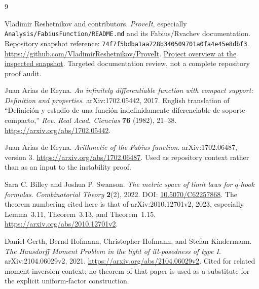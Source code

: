 \documentclass[11pt,a4paper]{article}
\theoremstyle{definition}
\theoremstyle{remark}
\newcommand{\repoSHA}{74f7f5bdba1aa728b340509701a0fa4e45e8dbf3}
\begin{document}
\begin{thebibliography}{9}
\small\raggedright

Vladimir Reshetnikov and contributors.
\emph{ProveIt}, especially \texttt{Analysis/FabiusFunction/README.md}
and its Fabius/Rvachev documentation.
Repository snapshot reference:
\texttt{\repoSHA}.
\url{https://github.com/VladimirReshetnikov/ProveIt}.
\href{https://github.com/VladimirReshetnikov/ProveIt/blob/74f7f5bdba1aa728b340509701a0fa4e45e8dbf3/Analysis/FabiusFunction/README.md}{Project overview at the inspected snapshot}.
Targeted documentation review, not a complete repository proof audit.

Juan Arias de Reyna.
\emph{An infinitely differentiable function with compact support:
Definition and properties}.
arXiv:1702.05442, 2017. English translation of
``Definici\'on y estudio de una funci\'on indefinidamente diferenciable de
soporte compacto,'' \emph{Rev. Real Acad. Ciencias} \textbf{76} (1982),
21--38.
\url{https://arxiv.org/abs/1702.05442}.

Juan Arias de Reyna.
\emph{Arithmetic of the Fabius function}.
arXiv:1702.06487, version 3.
\url{https://arxiv.org/abs/1702.06487}.
Used as repository context rather than as an input to the instability proof.

Sara C. Billey and Joshua P. Swanson.
\emph{The metric space of limit laws for $q$-hook formulas}.
\emph{Combinatorial Theory} \textbf{2}(2), 2022.
DOI: \href{https://doi.org/10.5070/C62257868}{10.5070/C62257868}.
The theorem numbering cited here is that of
arXiv:2010.12701v2, 2023, especially Lemma~3.11,
Theorem~3.13, and Theorem~1.15.
\url{https://arxiv.org/abs/2010.12701v2}.

Daniel Gerth, Bernd Hofmann, Christopher Hofmann, and Stefan Kindermann.
\emph{The Hausdorff Moment Problem in the light of ill-posedness of type I}.
arXiv:2104.06029v2, 2021.
\url{https://arxiv.org/abs/2104.06029v2}.
Cited for related moment-inversion context; no theorem of that paper is
used as a substitute for the explicit uniform-factor construction.

\end{thebibliography}
\end{document}
